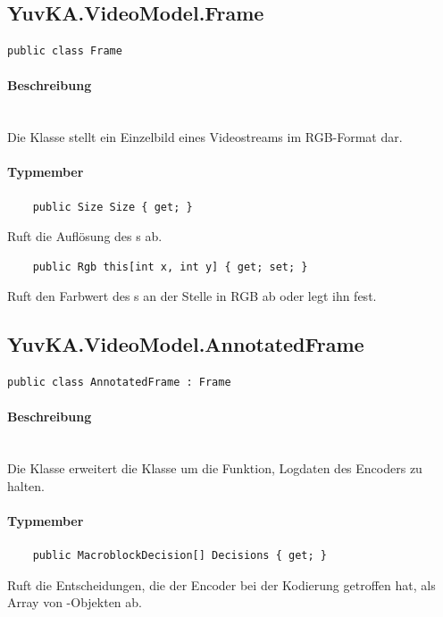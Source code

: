 \subsection{YuvKA.VideoModel.Frame}

\begin{verbatim}
public class Frame
\end{verbatim}

\paragraph{Beschreibung}~\\
Die Klasse  stellt ein Einzelbild eines Videostreams im RGB-Format dar.

\paragraph{Typmember}
\begin{itemize}

	\begin{verbatim}
	public Size Size { get; }
	\end{verbatim}
	Ruft die Auflösung des s ab.

	\begin{verbatim}
	public Rgb this[int x, int y] { get; set; }
	\end{verbatim}
	Ruft den Farbwert des s an der Stelle  in RGB ab oder legt ihn fest.

\end{itemize}

\subsection{YuvKA.VideoModel.AnnotatedFrame}

\begin{verbatim}
public class AnnotatedFrame : Frame
\end{verbatim}

\paragraph{Beschreibung}~\\
Die Klasse  erweitert die Klasse  um die Funktion, Logdaten des Encoders zu halten.

\paragraph{Typmember}
\begin{itemize}

	\begin{verbatim}
	public MacroblockDecision[] Decisions { get; }
	\end{verbatim}
	Ruft die Entscheidungen, die der Encoder bei der Kodierung getroffen hat, als Array von -Objekten ab.

\end{itemize}

